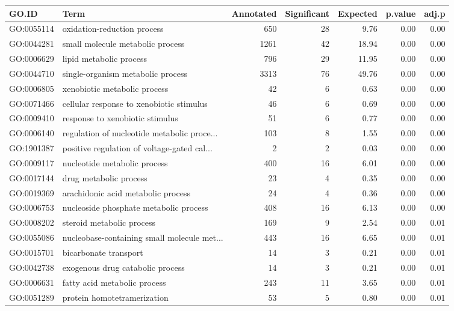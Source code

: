 \begin{table}[ht]
\centering
\begin{tabular}{llrrrrr}
  \hline
GO.ID & Term & Annotated & Significant & Expected & p.value & adj.p \\ 
  \hline
GO:0055114 & oxidation-reduction process & 650 &  28 & 9.76 & 0.00 & 0.00 \\ 
  GO:0044281 & small molecule metabolic process & 1261 &  42 & 18.94 & 0.00 & 0.00 \\ 
  GO:0006629 & lipid metabolic process & 796 &  29 & 11.95 & 0.00 & 0.00 \\ 
  GO:0044710 & single-organism metabolic process & 3313 &  76 & 49.76 & 0.00 & 0.00 \\ 
  GO:0006805 & xenobiotic metabolic process &  42 &   6 & 0.63 & 0.00 & 0.00 \\ 
  GO:0071466 & cellular response to xenobiotic stimulus &  46 &   6 & 0.69 & 0.00 & 0.00 \\ 
  GO:0009410 & response to xenobiotic stimulus &  51 &   6 & 0.77 & 0.00 & 0.00 \\ 
  GO:0006140 & regulation of nucleotide metabolic proce... & 103 &   8 & 1.55 & 0.00 & 0.00 \\ 
  GO:1901387 & positive regulation of voltage-gated cal... &   2 &   2 & 0.03 & 0.00 & 0.00 \\ 
  GO:0009117 & nucleotide metabolic process & 400 &  16 & 6.01 & 0.00 & 0.00 \\ 
  GO:0017144 & drug metabolic process &  23 &   4 & 0.35 & 0.00 & 0.00 \\ 
  GO:0019369 & arachidonic acid metabolic process &  24 &   4 & 0.36 & 0.00 & 0.00 \\ 
  GO:0006753 & nucleoside phosphate metabolic process & 408 &  16 & 6.13 & 0.00 & 0.00 \\ 
  GO:0008202 & steroid metabolic process & 169 &   9 & 2.54 & 0.00 & 0.01 \\ 
  GO:0055086 & nucleobase-containing small molecule met... & 443 &  16 & 6.65 & 0.00 & 0.01 \\ 
  GO:0015701 & bicarbonate transport &  14 &   3 & 0.21 & 0.00 & 0.01 \\ 
  GO:0042738 & exogenous drug catabolic process &  14 &   3 & 0.21 & 0.00 & 0.01 \\ 
  GO:0006631 & fatty acid metabolic process & 243 &  11 & 3.65 & 0.00 & 0.01 \\ 
  GO:0051289 & protein homotetramerization &  53 &   5 & 0.80 & 0.00 & 0.01 \\ 

\end{tabular}
\end{table}
